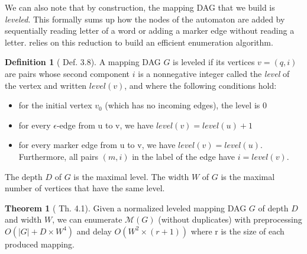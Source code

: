 \documentclass[12px]{article}
\theoremstyle{definition}
\newtheorem{definition}{Definition}
\newtheorem{theorem}{Theorem}
\begin{document}
        We can also note that by construction, the mapping DAG that we build is
        \textit{leveled}. This formally sums up how the nodes of the automaton
        are added by sequentially reading letter of a word or adding a marker
        edge without reading a letter. \cite{ICDT19} relies on this reduction
        to build an efficient enumeration algorithm.

        \begin{definition}[\cite{ICDT19} Def. 3.8]
          A mapping DAG $G$ is leveled if its vertices $v = (q, i)$ are pairs
          whose second component $i$ is a nonnegative integer called the
          \textit{level} of the vertex and written $level(v)$, and where the
          following conditions hold:
            \begin{itemize}
              \item for the initial vertex $v_0$ (which has no incoming edges),
                the level is $0$
              \item for every $\epsilon$-edge from u to v, we have $level(v) =
                level(u) + 1$
              \item for every marker edge from u to v, we have $level(v) =
                level(u)$. Furthermore, all pairs $(m, i)$ in the label of the
                edge have $i = level(v)$.
            \end{itemize}

          The depth $D$ of $G$ is the maximal level. The width $W$ of $G$ is
          the maximal number of vertices that have the same level.
        \end{definition}

        \begin{theorem}[\cite{ICDT19} Th. 4.1]
          Given a normalized leveled mapping DAG $G$ of depth $D$ and width
          $W$, we can enumerate $\mathcal{M}(G)$ (without duplicates) with
          preprocessing $O(|G| + D \times W^4 )$ and delay $O(W^2 \times (r +
          1))$ where r is the size of each produced mapping.
        \end{theorem}
\end{document}
